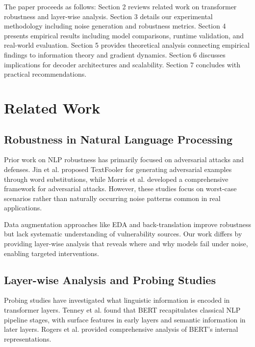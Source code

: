 \documentclass{article}
\begin{document}
The paper proceeds as follows: Section 2 reviews related work on transformer robustness and layer-wise analysis. Section 3 details our experimental methodology including noise generation and robustness metrics. Section 4 presents empirical results including model comparisons, runtime validation, and real-world evaluation. Section 5 provides theoretical analysis connecting empirical findings to information theory and gradient dynamics. Section 6 discusses implications for decoder architectures and scalability. Section 7 concludes with practical recommendations.

\section{Related Work}

\subsection{Robustness in Natural Language Processing}

Prior work on NLP robustness has primarily focused on adversarial attacks and defenses. Jin et al. \cite{jin2020bert} proposed TextFooler for generating adversarial examples through word substitutions, while Morris et al. \cite{morris2020textattack} developed a comprehensive framework for adversarial attacks. However, these studies focus on worst-case scenarios rather than naturally occurring noise patterns common in real applications.

Data augmentation approaches like EDA \cite{wei2019eda} and back-translation \cite{edunov2018understanding} improve robustness but lack systematic understanding of vulnerability sources. Our work differs by providing layer-wise analysis that reveals where and why models fail under noise, enabling targeted interventions.

\subsection{Layer-wise Analysis and Probing Studies}

Probing studies have investigated what linguistic information is encoded in transformer layers. Tenney et al. \cite{tenney2019bert} found that BERT recapitulates classical NLP pipeline stages, with surface features in early layers and semantic information in later layers. Rogers et al. \cite{rogers2021primer} provided comprehensive analysis of BERT's internal representations.
\end{document}
